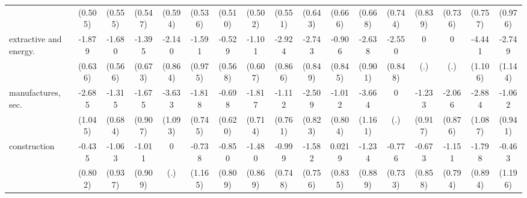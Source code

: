 {\begin{tabular}{l*{16}{c}}
                    &     (0.505)         &     (0.555)         &     (0.547)         &     (0.594)         &     (0.536)         &     (0.510)         &     (0.502)         &     (0.551)         &     (0.643)         &     (0.666)         &     (0.668)         &     (0.744)         &     (0.839)         &     (0.736)         &     (0.757)         &     (0.976)         \\
[1em]
extractive and energy.&      -1.879\sym{**} &      -1.680\sym{**} &      -1.395\sym{*}  &      -2.140\sym{*}  &      -1.591         &      -0.529         &      -1.101         &      -2.924\sym{***}&      -2.743\sym{**} &      -0.906         &      -2.638\sym{**} &      -2.550\sym{**} &           0         &           0         &      -4.441\sym{***}&      -2.749\sym{*}  \\
                    &     (0.636)         &     (0.566)         &     (0.673)         &     (0.864)         &     (0.975)         &     (0.568)         &     (0.607)         &     (0.866)         &     (0.849)         &     (0.845)         &     (0.901)         &     (0.848)         &         (.)         &         (.)         &     (1.106)         &     (1.144)         \\
[1em]
manufactures, sec.  &      -2.685\sym{*}  &      -1.315         &      -1.675         &      -3.633\sym{***}&      -1.818\sym{*}  &      -0.698         &      -1.817\sym{*}  &      -1.112         &      -2.509\sym{**} &      -1.012         &      -3.664\sym{**} &           0         &      -1.233         &      -2.066\sym{*}  &      -2.884\sym{**} &      -1.062         \\
                    &     (1.045)         &     (0.684)         &     (0.907)         &     (1.093)         &     (0.745)         &     (0.620)         &     (0.714)         &     (0.761)         &     (0.823)         &     (0.804)         &     (1.161)         &         (.)         &     (0.917)         &     (0.876)         &     (1.087)         &     (0.941)         \\
[1em]
construction        &      -0.435         &      -1.063         &      -1.011         &           0         &      -0.738         &      -0.850         &      -1.480         &      -0.999         &      -1.582\sym{*}  &      0.0219         &      -1.234         &      -0.776         &      -0.673         &      -1.151         &      -1.798\sym{*}  &      -0.463         \\
                    &     (0.802)         &     (0.937)         &     (0.909)         &         (.)         &     (1.165)         &     (0.809)         &     (0.869)         &     (0.748)         &     (0.756)         &     (0.835)         &     (0.889)         &     (0.733)         &     (0.858)         &     (0.794)         &     (0.894)         &     (1.196)         \\

\end{tabular}}
